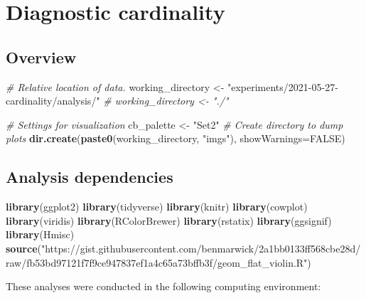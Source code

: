 \documentclass[]{book}
\newenvironment{Shaded}{\begin{snugshade}}{\end{snugshade}}
\newcommand{\CommentTok}[1]{\textcolor[rgb]{0.56,0.35,0.01}{\textit{#1}}}
\newcommand{\DataTypeTok}[1]{\textcolor[rgb]{0.13,0.29,0.53}{#1}}
\newcommand{\KeywordTok}[1]{\textcolor[rgb]{0.13,0.29,0.53}{\textbf{#1}}}
\newcommand{\NormalTok}[1]{#1}
\newcommand{\OtherTok}[1]{\textcolor[rgb]{0.56,0.35,0.01}{#1}}
\newcommand{\StringTok}[1]{\textcolor[rgb]{0.31,0.60,0.02}{#1}}
\begin{document}
\hypertarget{diagnostic-cardinality}{%
\chapter{Diagnostic cardinality}\label{diagnostic-cardinality}}

\hypertarget{overview-1}{%
\section{Overview}\label{overview-1}}

\begin{Shaded}
\begin{Highlighting}[]
\CommentTok{# Relative location of data.}
\NormalTok{working_directory <-}
\StringTok{  "experiments/2021-05-27-cardinality/analysis/"}
\CommentTok{# working_directory <- "./"}

\CommentTok{# Settings for visualization}
\NormalTok{cb_palette <-}\StringTok{ "Set2"}
\CommentTok{# Create directory to dump plots}
\KeywordTok{dir.create}\NormalTok{(}\KeywordTok{paste0}\NormalTok{(working_directory, }\StringTok{"imgs"}\NormalTok{), }\DataTypeTok{showWarnings=}\OtherTok{FALSE}\NormalTok{)}
\end{Highlighting}
\end{Shaded}

\hypertarget{analysis-dependencies-1}{%
\section{Analysis dependencies}\label{analysis-dependencies-1}}

\begin{Shaded}
\begin{Highlighting}[]
\KeywordTok{library}\NormalTok{(ggplot2)}
\KeywordTok{library}\NormalTok{(tidyverse)}
\KeywordTok{library}\NormalTok{(knitr)}
\KeywordTok{library}\NormalTok{(cowplot)}
\KeywordTok{library}\NormalTok{(viridis)}
\KeywordTok{library}\NormalTok{(RColorBrewer)}
\KeywordTok{library}\NormalTok{(rstatix)}
\KeywordTok{library}\NormalTok{(ggsignif)}
\KeywordTok{library}\NormalTok{(Hmisc)}
\KeywordTok{source}\NormalTok{(}\StringTok{"https://gist.githubusercontent.com/benmarwick/2a1bb0133ff568cbe28d/raw/fb53bd97121f7f9ce947837ef1a4c65a73bffb3f/geom_flat_violin.R"}\NormalTok{)}
\end{Highlighting}
\end{Shaded}

These analyses were conducted in the following computing environment:
\end{document}
